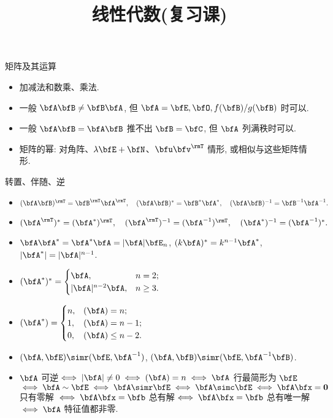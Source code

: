 \documentclass[aspectratio=169,handout]{ctexbeamer}
\title{线性代数(复习课)}
\let\rank\relax\DeclareMathOperator\rank{R}
\begin{document}
\begin{frame}{矩阵及其运算}
	\onslide<+->
	\begin{itemize}
		\item 加减法和数乘、乘法.
		\item 一般 $\bfA\bfB\neq \bfB\bfA$, 但 $\bfA=\bfE,\bfO,f(\bfB)/g(\bfB)$ 时可以.
		\item 一般 $\bfA\bfB=\bfA\bfB$ 推不出 $\bfB=\bfC$, 但 $\bfA$ 列满秩时可以.
		\item 矩阵的幂: 对角阵、$\lambda \bfE+\bfN$、$\bfu\bfv^\rmT$ 情形, 或相似与这些矩阵情形.
	\end{itemize}
\end{frame}
	
	
\begin{frame}{转置、伴随、逆}
	\onslide<+->
	\begin{itemize}
		\item $(\bfA\bfB)^\rmT=\bfB^\rmT\bfA^\rmT,\quad
			(\bfA\bfB)^*=\bfB^*\bfA^*,\quad
			(\bfA\bfB)^{-1}=\bfB^{-1}\bfA^{-1}.$
		\item $(\bfA^\rmT)^*=(\bfA^*)^\rmT,\quad
			(\bfA^\rmT)^{-1}=(\bfA^{-1})^\rmT,\quad
			(\bfA^*)^{-1}=(\bfA^{-1})^*.$
		\item $\bfA\bfA^*=\bfA^*\bfA=|\bfA|\bfE_n$, $(k\bfA)^*=k^{n-1}\bfA^*$,  $|\bfA^*|=|\bfA|^{n-1}$.
		\item $(\bfA^*)^*=\begin{cases}
			\bfA,&n=2;\\
			|\bfA|^{n-2}\bfA,&n\ge3.
		\end{cases}$
		\item $\rank(\bfA^*)=\begin{cases}
			n,&\rank(\bfA)=n;\\
			1,&\rank(\bfA)=n-1;\\
			0,&\rank(\bfA)\le n-2.
		\end{cases}$
		\item $(\bfA,\bfE)\simr (\bfE,\bfA^{-1})$,
		$(\bfA,\bfB)\simr (\bfE,\bfA^{-1}\bfB)$.
		\item $\bfA$ 可逆$\iff |\bfA|\neq0 \iff \rank(\bfA)=n\iff\bfA$ 行最简形为 $\bfE$ $\iff\bfA\sim\bfE\iff\bfA\simr\bfE\iff\bfA\simc\bfE\iff\bfA\bfx={\bf0}$ 只有零解 $\iff\bfA\bfx=\bfb$ 总有解$\iff\bfA\bfx=\bfb$ 总有唯一解 $\iff\bfA$ 特征值都非零.
	\end{itemize}
\end{frame}
\end{document}

